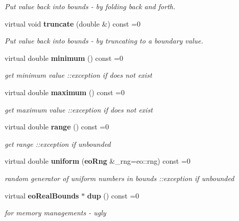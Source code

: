 \begin{CompactItemize}
\begin{CompactList}\small\item\em Put value back into bounds - by folding back and forth. \item\end{CompactList}\item 
virtual void {\bf truncate} (double \&) const =0\label{classeo_real_bounds_a7}

\begin{CompactList}\small\item\em Put value back into bounds - by truncating to a boundary value. \item\end{CompactList}\item 
virtual double {\bf minimum} () const =0\label{classeo_real_bounds_a8}

\begin{CompactList}\small\item\em get minimum value ::exception if does not exist \item\end{CompactList}\item 
virtual double {\bf maximum} () const =0\label{classeo_real_bounds_a9}

\begin{CompactList}\small\item\em get maximum value ::exception if does not exist \item\end{CompactList}\item 
virtual double {\bf range} () const =0\label{classeo_real_bounds_a10}

\begin{CompactList}\small\item\em get range ::exception if unbounded \item\end{CompactList}\item 
virtual double {\bf uniform} ({\bf eo\-Rng} \&\_\-rng=eo::rng) const =0\label{classeo_real_bounds_a11}

\begin{CompactList}\small\item\em random generator of uniform numbers in bounds ::exception if unbounded \item\end{CompactList}\item 
virtual {\bf eo\-Real\-Bounds} $\ast$ {\bf dup} () const =0\label{classeo_real_bounds_a12}

\begin{CompactList}\small\item\em for memory managements - ugly \item\end{CompactList}\end{CompactItemize}



